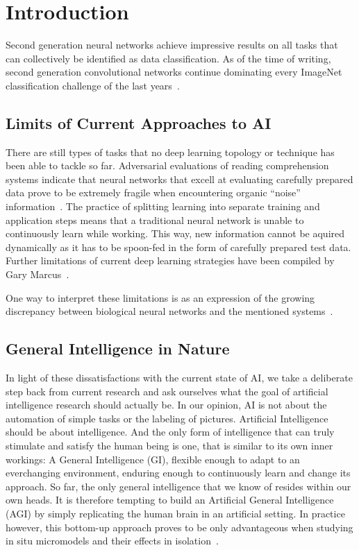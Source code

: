 \section{Introduction}

Second generation neural networks achieve impressive results
on all tasks that can collectively be identified as data classification.
As of the time of writing, second generation convolutional networks
continue dominating every ImageNet classification challenge of the last
years~\cite{ILSVRC15}.

\subsection{Limits of Current Approaches to AI}
There are still types of tasks that no deep learning topology or
technique has been able to tackle so far. Adversarial evaluations of reading comprehension
systems indicate that neural networks that excell at evaluating carefully
prepared data prove to be extremely fragile when encountering organic ``noise''
information~\cite{DBLP:journals/corr/JiaL17}.
The practice of splitting learning into separate training and application steps
means that a traditional neural network is unable to continuously learn while working.
This way, new information cannot be aquired dynamically as it has to be spoon-fed in the
form of carefully prepared test data.
Further limitations of current deep learning strategies have been compiled by 
Gary Marcus~\cite{DBLP:journals/corr/abs-1801-00631}.

One way to interpret these limitations is as an expression of the growing discrepancy between
biological neural networks and the mentioned systems~\cite{Paugam-Moisy2012}.

\subsection{General Intelligence in Nature}
In light of these dissatisfactions with the current state of AI, we take a deliberate step back 
from current research and ask ourselves what the goal of artificial intelligence research should actually be.
In our opinion, AI is not about the automation of simple tasks or the labeling of pictures. 
Artificial Intelligence should be about intelligence. And the only form of intelligence that can truly
stimulate and satisfy the human being is one, that is similar to its own inner workings: A General Intelligence (GI),
flexible enough to adapt to an everchanging environment, enduring enough to continuously learn and change its approach.
So far, the only general intelligence that we know of resides within our own heads. It is therefore tempting to
build an Artificial General Intelligence (AGI) by simply replicating the human brain in an artificial setting. In practice
however, this bottom-up approach proves to be only advantageous when studying in situ micromodels and 
their effects in isolation~\cite{Dudai2014}. 

